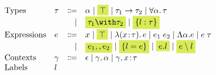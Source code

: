 \[
\begin{array}{l}
  \begin{array}{llrl}
    \text{Types}
    & \tau & \Coloneqq & \alpha \mid \highlight{$\top$} \mid \tau_1 \to \tau_2 \mid \for \alpha \tau \\
    &      & \mid      & \highlight{$\tau_1 \andOp \tau_2$} \mid \highlight{$\recordType l \tau$} \\
    \text{Expressions}
    & e & \Coloneqq & x \mid \highlight{$\top$} \mid \lam x \tau e \mid \app {e_1} {e_2} \mid \blam \alpha e \mid \tapp e \tau \\
    &   & \mid      & \highlight {$e_1 \mergeOp e_2$} \mid \highlight {$\recordCon l e$} \mid
                      \highlight {$e.l$} \mid \highlight{$e \restrictOp l$} \\
    \text{Contexts}
    & \gamma & \Coloneqq & \epsilon \mid \gamma, \alpha \mid \gamma, x \hast \tau \\
    \text{Labels} & l
  \end{array}
\end{array}
\]
